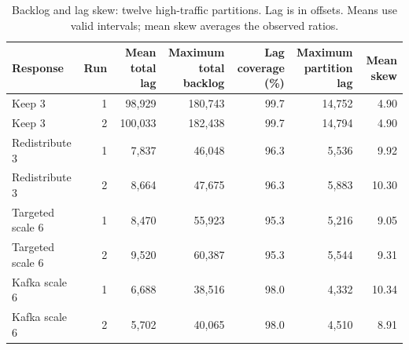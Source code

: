 \begin{table}[!htbp]
\centering\small
\setlength{\tabcolsep}{3pt}
\renewcommand{\arraystretch}{1.12}
\begin{tabular}{@{}lrrrrrr@{}}
\toprule
Response & Run & \shortstack{Mean total\\lag} & \shortstack{Maximum\\total backlog} & \shortstack{Lag coverage\\(\%)} & \shortstack{Maximum\\partition lag} & Mean skew\\
\midrule
Keep 3 & 1 & 98,929 & 180,743 & 99.7 & 14,752 & 4.90\\
Keep 3 & 2 & 100,033 & 182,438 & 99.7 & 14,794 & 4.90\\
Redistribute 3 & 1 & 7,837 & 46,048 & 96.3 & 5,536 & 9.92\\
Redistribute 3 & 2 & 8,664 & 47,675 & 96.3 & 5,883 & 10.30\\
Targeted scale 6 & 1 & 8,470 & 55,923 & 95.3 & 5,216 & 9.05\\
Targeted scale 6 & 2 & 9,520 & 60,387 & 95.3 & 5,544 & 9.31\\
Kafka scale 6 & 1 & 6,688 & 38,516 & 98.0 & 4,332 & 10.34\\
Kafka scale 6 & 2 & 5,702 & 40,065 & 98.0 & 4,510 & 8.91\\
\bottomrule
\end{tabular}
\caption{Backlog and lag skew: twelve high-traffic partitions. Lag is in offsets. Means use valid intervals; mean skew averages the observed ratios.}
\label{tab:twelve-partition-diagnostics}
\end{table}

